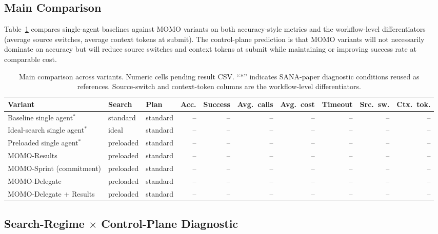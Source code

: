 \subsection{Main Comparison}

Table~\ref{tab:main} compares single-agent baselines against MOMO variants on both accuracy-style metrics and the workflow-level differentiators (average source switches, average context tokens at submit). The control-plane prediction is that MOMO variants will not necessarily dominate on accuracy but will reduce source switches and context tokens at submit while maintaining or improving success rate at comparable cost.

\begin{table}[t]
\caption{Main comparison across variants. Numeric cells pending result CSV. ``$\ast$'' indicates SANA-paper diagnostic conditions reused as references. Source-switch and context-token columns are the workflow-level differentiators.}
\label{tab:main}
\centering
\begin{tabular}{lllrrrrrrr}
\toprule
Variant & Search & Plan & Acc. & Success & Avg.\ calls & Avg.\ cost & Timeout & Src.\ sw. & Ctx.\ tok. \\
\midrule
Baseline single agent$^{\ast}$           & standard  & standard & -- & -- & -- & -- & -- & -- & -- \\
Ideal-search single agent$^{\ast}$       & ideal     & standard & -- & -- & -- & -- & -- & -- & -- \\
Preloaded single agent$^{\ast}$          & preloaded & standard & -- & -- & -- & -- & -- & -- & -- \\
MOMO-Results                             & preloaded & standard & -- & -- & -- & -- & -- & -- & -- \\
MOMO-Sprint (commitment)                 & preloaded & standard & -- & -- & -- & -- & -- & -- & -- \\
MOMO-Delegate                            & preloaded & standard & -- & -- & -- & -- & -- & -- & -- \\
MOMO-Delegate + Results                  & preloaded & standard & -- & -- & -- & -- & -- & -- & -- \\
\bottomrule
\end{tabular}
\end{table}

\subsection{Search-Regime $\times$ Control-Plane Diagnostic}

